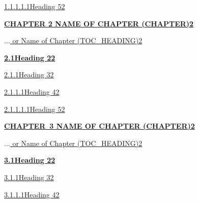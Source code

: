 \documentclass[12pt]{report}
\begin{document}
\begin{FlushLeft}
\href{}{1.1.1.1.1Heading 52}
\end{FlushLeft}\par

\begin{FlushLeft}
\textbf{\uppercase{\href{}{Chapter 2  Name of chapter (Chapter)2}}}
\end{FlushLeft}\par

\href{}{$ \ldots $ or Name of Chapter (TOC\_HEADING)2}\par

\begin{FlushLeft}
\textbf{\href{}{2.1Heading 22}}
\end{FlushLeft}\par

\begin{FlushLeft}
\href{}{2.1.1Heading 32}
\end{FlushLeft}\par

\begin{FlushLeft}
\href{}{2.1.1.1Heading 42}
\end{FlushLeft}\par

\begin{FlushLeft}
\href{}{2.1.1.1.1Heading 52}
\end{FlushLeft}\par

\begin{FlushLeft}
\textbf{\uppercase{\href{}{Chapter\ 3  Name of chapter (Chapter)2}}}
\end{FlushLeft}\par

\href{}{$ \ldots $ or Name of Chapter (TOC\_HEADING)2}\par

\begin{FlushLeft}
\textbf{\href{}{3.1Heading 22}}
\end{FlushLeft}\par

\begin{FlushLeft}
\href{}{3.1.1Heading 32}
\end{FlushLeft}\par

\begin{FlushLeft}
\href{}{3.1.1.1Heading 42}
\end{FlushLeft}\par
\end{document}
